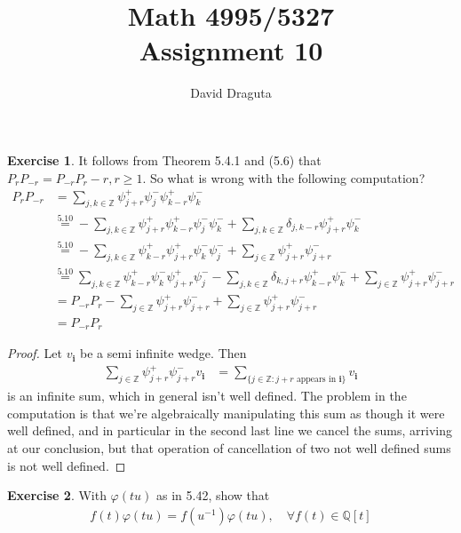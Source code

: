 \documentclass[12pt]{extarticle}
\title{ Math 4995/5327
  \\
  Assignment 10}
\author{David Draguta}
\newcommand{\set}[1]{\{#1\}}
\newcommand{\Q}{\mathbb{Q}}
\newcommand{\Z}{\mathbb{Z}}
\newcommand{\<}{\langle}
\renewcommand{\>}{\rangle}
\theoremstyle{definition}
\newtheorem{exercise}{Exercise}
\begin{document}
\maketitle

\begin{exercise}
  It follows from Theorem 5.4.1 and (5.6) that $P_{r}P_{-r} = P_{-r}P_r - r, r \geq 1.$ So what is wrong with the following computation?
  \begin{align*}
    P_r P_{-r}
    &= \sum\limits_{j,k \in \Z} \psi_{j+r}^+ \psi_{j}^-\psi_{k-r}^+\psi_k^- \\
    &\overset{5.10}{=} - \sum\limits_{j,k \in \Z} \psi_{j+r}^+\psi_{k-r}^+\psi_j^-\psi_k^- + \sum\limits_{j,k \in \Z} \delta_{j,k-r}\psi_{j+r}^+\psi_k^- \\
    &\overset{5.10}{=} - \sum\limits_{j,k \in \Z} \psi_{k-r}^+\psi_{j+r}^+\psi_k^-\psi_j^- + \sum\limits_{j \in \Z} \psi_{j+r}^+\psi_{j+r}^- \\
    &\overset{5.10}{=} \sum\limits_{j,k \in \Z} \psi_{k-r}^+\psi_{k}^-\psi_{j+r}^+\psi_j^- - \sum\limits_{j,k \in \Z} \delta_{k,j+r}\psi_{k-r}^+\psi_k^- + \sum\limits_{j \in \Z} \psi_{j+r}^+ \psi_{j+r}^- \\
    &= P_{-r}P_{r} - \sum\limits_{j \in \Z} \psi_{j +r}^+\psi_{j+r}^- + \sum\limits_{j \in \Z} \psi_{j+r}^+\psi_{j+r}^-  \\
    &= P_{-r}P_{r}
  \end{align*}
\end{exercise}
\begin{proof}
  Let $v_{\mathbf{i}}$ be a semi infinite wedge. Then
  \begin{align*}
    \sum\limits_{j \in \Z} \psi_{j +r}^+\psi_{j+r}^- v_{\mathbf{i}}
    &=
    \sum\limits_{\set{j \in \Z: j+r \text{ appears in } \mathbf{i}}} v_{\mathbf{i}} 
  \end{align*}
  is an infinite sum, which in general isn't well defined. The problem in the computation is that we're algebraically manipulating this sum as though it were well defined, and in particular in the second last line we cancel the sums, arriving at our conclusion, but that operation of cancellation of two not well defined sums is not well defined.
\end{proof}
\newpage
\begin{exercise}
  With $\varphi(tu)$ as in 5.42, show that
  \begin{align*}
    f(t)\varphi(tu) = f(u^{-1})\varphi(tu), \quad \forall f(t) \in \Q[t]
  \end{align*}
\end{exercise}
\end{document}
